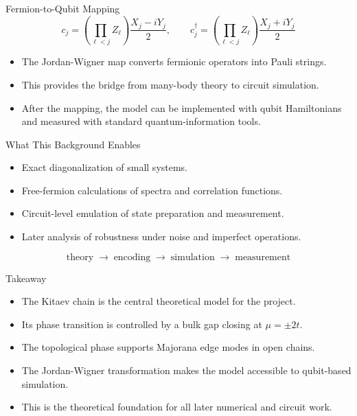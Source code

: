 \documentclass[aspectratio=169]{beamer}
\begin{document}
\begin{frame}{Fermion-to-Qubit Mapping}
\[
c_j =
\left(\prod_{\ell<j} Z_\ell\right)\frac{X_j - iY_j}{2},
\qquad
c_j^\dagger =
\left(\prod_{\ell<j} Z_\ell\right)\frac{X_j + iY_j}{2}
\]

\begin{itemize}
\item The Jordan-Wigner map converts fermionic operators into Pauli strings.
\item This provides the bridge from many-body theory to circuit simulation.
\item After the mapping, the model can be implemented with qubit Hamiltonians and measured with standard quantum-information tools.
\end{itemize}
\end{frame}

\begin{frame}{What This Background Enables}
\begin{itemize}
\item Exact diagonalization of small systems.
\item Free-fermion calculations of spectra and correlation functions.
\item Circuit-level emulation of state preparation and measurement.
\item Later analysis of robustness under noise and imperfect operations.
\end{itemize}
\[
\text{theory} \;\rightarrow\; \text{encoding} \;\rightarrow\; \text{simulation} \;\rightarrow\; \text{measurement}
\]
\end{frame}

\begin{frame}{Takeaway}
\begin{itemize}
\item The Kitaev chain is the central theoretical model for the project.
\item Its phase transition is controlled by a bulk gap closing at \(\mu=\pm 2t\).
\item The topological phase supports Majorana edge modes in open chains.
\item The Jordan-Wigner transformation makes the model accessible to qubit-based simulation.
\item This is the theoretical foundation for all later numerical and circuit work.
\end{itemize}
\end{frame}
\end{document}
